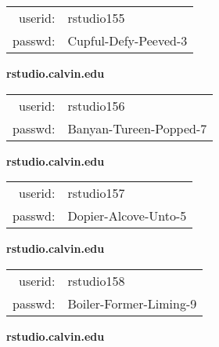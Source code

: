 \documentclass{article}\usepackage[]{graphicx}\usepackage[]{color}
\begin{document}
\begin{multicols}{3}
\begin{minipage}{.3\textwidth}
\begin{tabular}{rl}
userid: & rstudio155\\
passwd: & Cupful-Defy-Peeved-3

\vspace{5mm}

\end{tabular}\end{minipage}

\vspace{5mm}

\begin{minipage}{.3\textwidth}
\centerline{\textbf{rstudio.calvin.edu}}
\medskip
\begin{tabular}{rl}

userid: & rstudio156\\
passwd: & Banyan-Tureen-Popped-7

\vspace{5mm}

\end{tabular}\end{minipage}

\vspace{5mm}

\begin{minipage}{.3\textwidth}
\centerline{\textbf{rstudio.calvin.edu}}
\medskip
\begin{tabular}{rl}

userid: & rstudio157\\
passwd: & Dopier-Alcove-Unto-5

\vspace{5mm}

\end{tabular}\end{minipage}

\vspace{5mm}

\begin{minipage}{.3\textwidth}
\centerline{\textbf{rstudio.calvin.edu}}
\medskip
\begin{tabular}{rl}

userid: & rstudio158\\
passwd: & Boiler-Former-Liming-9

\vspace{5mm}

\end{tabular}\end{minipage}

\vspace{5mm}

\begin{minipage}{.3\textwidth}
\centerline{\textbf{rstudio.calvin.edu}}
\medskip
\begin{tabular}{rl}


\end{tabular}
\end{minipage}
\end{multicols}
\end{document}
